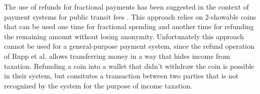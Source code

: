 \documentclass[sigconf, authordraft]{acmart}
\begin{document}







The use of refunds for fractional payments has been suggested in the context of
payment systems for public transit fees \cite{rupp2013p4r}.  This approach
relies on 2-showable coins that can be used one time for fractional spending
and another time for refunding the remaining amount without losing anonymity.
Unfortunately this approach cannot be used for a general-purpose payment
system, since the refund operation of Rupp et al. allows transferring money
in a way that hides income from taxation.  Refunding a coin into a wallet that
didn't withdraw the coin is possible in their system, but consitutes a
transaction between two parties that is not recognized by the system for the
purpose of income taxation.
\end{document}
